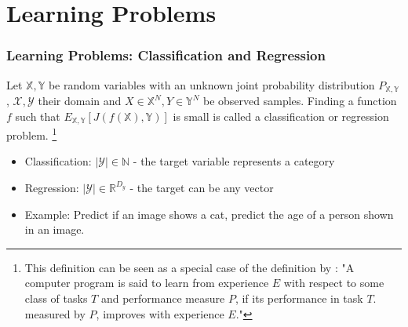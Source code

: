 \section{Learning Problems} %

\begin{frame}
\frametitle{Learning Problems: Classification and Regression}

\begin{definition}
    Let $\mathbb{X}, \mathbb{Y}$ be random variables with an unknown joint probability distribution $P_{\mathbb{X}, \mathbb{Y}}$, $\mathcal{X}, \mathcal{Y}$ their domain and $X \in \mathbb{X}^N, Y \in \mathbb{Y}^N$ be observed samples. Finding a function $f$ such that $E_{\mathbb{X}, \mathbb{Y}}[J(f(\mathbb{X}), \mathbb{Y})]$ is small is called a classification or regression problem. \footnote{
        This definition can be seen as a special case of the definition by \cite{mitchell_machine_1997}: "A computer program is said to learn from experience $E$ with respect to some class of tasks $T$ and performance measure $P$, if its performance in task $T$. measured by $P$, improves with experience $E$."
    }
\end{definition}

\begin{itemize}
    \item Classification: $|\mathcal{Y}| \in \mathbb{N}$ - the target variable represents a category
    \item Regression: $|\mathcal{Y}| \in \mathbb{R}^{D_y}$ - the target can be any vector
    \item Example: Predict if an image shows a cat, predict the age of a person shown in an image.
\end{itemize}


\end{frame}